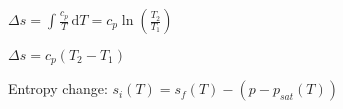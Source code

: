 \( \Delta s = \int \frac{c_p}{T} \, \text{d}T = c_p \ln \left( \frac{T_2}{T_1} \right) \)  

\( \Delta s = c_p \left( T_2 - T_1 \right) \)  

Entropy change:  
\( s_i (T) = s_f (T) - \left( p - p_{sat} (T) \right) \)